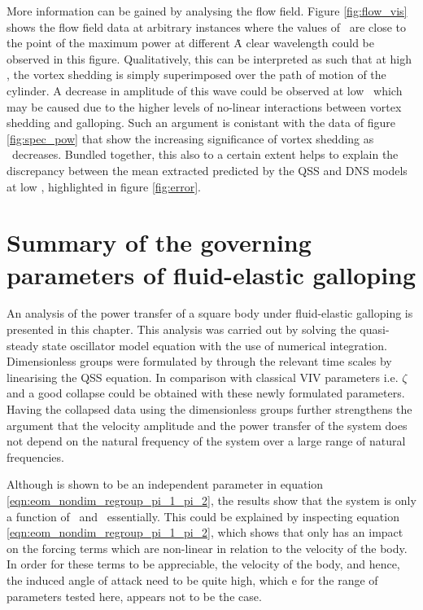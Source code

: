 



More information can be gained by analysing the flow field. Figure \ref{fig:flow_vis} shows the flow field data at arbitrary instances where the values of \massdamp\ are close to the point of the maximum power at different \massstiff\. A clear wavelength could be observed in this figure. Qualitatively, this can be interpreted as such that at high \massstiff, the vortex shedding is simply superimposed over the path of motion of the cylinder. A decrease in amplitude of this wave could be observed at low \massstiff\ which may be caused due to the higher levels of no-linear interactions between vortex shedding and galloping. Such an argument is conistant with the data of figure \ref{fig:spec_pow} that show the increasing significance of vortex shedding as \massstiff\ decreases. Bundled together, this also to a certain extent helps to explain the discrepancy between the mean extracted predicted by the QSS and DNS models at low \massstiff, highlighted in figure \ref{fig:error}.


\section{Summary of the governing parameters of  fluid-elastic galloping}
\label{sec:summary-pi_1-pi_2}

An analysis of the power transfer of a square body under fluid-elastic galloping is presented in this chapter. This analysis was carried out by solving the quasi-steady state oscillator model equation with the use of numerical integration. Dimensionless groups were formulated by through the relevant time scales by linearising the QSS equation. In comparison with classical VIV parameters i.e. $\zeta$ and \ustar a good collapse could be obtained with these newly formulated parameters. Having the collapsed data using the dimensionless groups further strengthens the argument that the velocity amplitude and the power transfer of the system does not depend on the natural frequency of the system over a large range of natural frequencies.


Although \mstar is shown to be an independent parameter in equation \ref{eqn:eom_nondim_regroup_pi_1_pi_2}, the results show that the system is only a function of \massstiff\ and \massdamp\ essentially. This could be explained by inspecting equation \ref{eqn:eom_nondim_regroup_pi_1_pi_2}, which shows that \mstar only has an impact on the forcing terms which are non-linear in relation to the velocity of the body. In order for these terms to be appreciable, the velocity of the body, and hence, the induced angle of attack need to be quite high, which e for the range of parameters tested here, appears not to be the case. 

